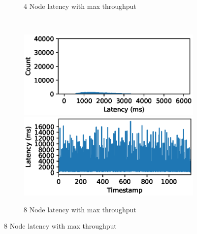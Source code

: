 \begin{figure}
\begin{subfigure}[b]{0.3\textwidth}
        \caption{4 Node latency with max throughput }
    \end{subfigure}
    ~ 
    \begin{subfigure}[b]{0.3\textwidth}
        \includegraphics[width=\textwidth]{eps/storm_agg_8node_th_max_hist}
         \includegraphics[width=\textwidth]{eps/storm_agg_8node_th_max_ts}

        \caption{8 Node latency with max throughput }
    \end{subfigure}





\end{figure}

